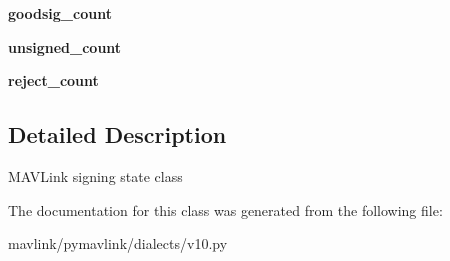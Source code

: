 \begin{DoxyCompactItemize}
{\bfseries goodsig\+\_\+count}
\item 
\mbox{\label{classpymavlink_1_1dialects_1_1v10_1_1MAVLinkSigning_aaa2981c7602098858e7b80388559ce53}} 
{\bfseries unsigned\+\_\+count}
\item 
\mbox{\label{classpymavlink_1_1dialects_1_1v10_1_1MAVLinkSigning_a9ae12fb642604c7cd04272ff182f66f7}} 
{\bfseries reject\+\_\+count}
\end{DoxyCompactItemize}


\subsection{Detailed Description}
\begin{DoxyVerb}MAVLink signing state class\end{DoxyVerb}
 

The documentation for this class was generated from the following file\+:\begin{DoxyCompactItemize}
\item 
mavlink/pymavlink/dialects/v10.\+py\end{DoxyCompactItemize}
